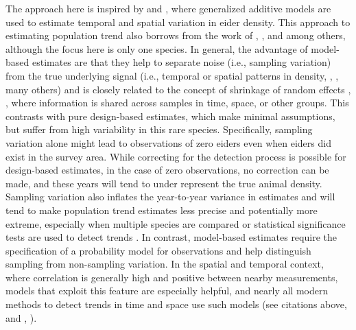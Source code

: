 \documentclass[
  10pt,
  letterpaper,
]{article}
\begin{document}
The approach here is inspired by \citep{miller2013} and
\citep{amundson2019}, where generalized additive models
\citep{hastie1986generalized} \citep{wood2017} are used to estimate
temporal and spatial variation in eider density. This approach to
estimating population trend also borrows from the work of
\citep{sauer2002hierarchical}, \citep{rosenberg2019decline}, and
\citep{smith2021north} among others, although the focus here is only one
species. In general, the advantage of model-based estimates are that
they help to separate noise (i.e., sampling variation) from the true
underlying signal (i.e., temporal or spatial patterns in density,
\citep{BDA3}, \citep{hooten2015guide}, many others) and is closely
related to the concept of shrinkage of random effects
\citep{efron1977stein}, \citep{BDA3}, where information is shared across
samples in time, space, or other groups. This contrasts with pure
design-based estimates, which make minimal assumptions, but suffer from
high variability in this rare species. Specifically, sampling variation
alone might lead to observations of zero eiders even when eiders did
exist in the survey area. While correcting for the detection process is
possible for design-based estimates, in the case of zero observations,
no correction can be made, and these years will tend to under represent
the true animal density. Sampling variation also inflates the
year-to-year variance in estimates and will tend to make population
trend estimates less precise and potentially more extreme, especially
when multiple species are compared or statistical significance tests are
used to detect trends \citep{sauer2002hierarchical}. In contrast,
model-based estimates require the specification of a probability model
for observations and help distinguish sampling from non-sampling
variation. In the spatial and temporal context, where correlation is
generally high and positive between nearby measurements, models that
exploit this feature are especially helpful, and nearly all modern
methods to detect trends in time and space use such models (see
citations above, and \citep{kery2015applied}, \citep{kery2020applied}).
\end{document}
